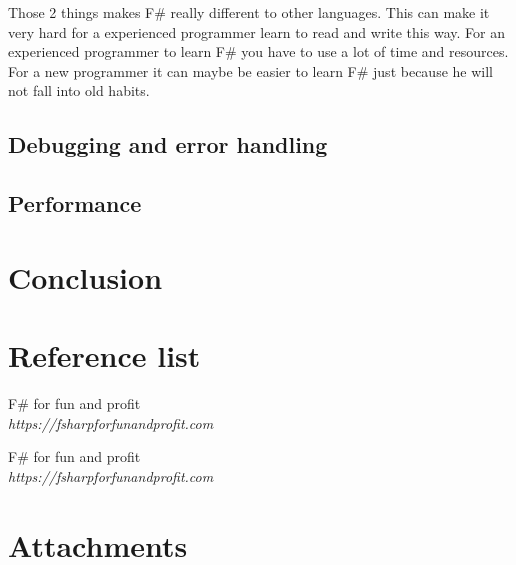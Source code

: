 \documentclass[12pt, a4paper]{article}
\begin{document}
Those 2 things makes F\# really different to other languages. This can make it very hard for a experienced programmer learn to read and write this way. For an experienced programmer to learn F\# you have to use a lot of time and resources. For a new programmer it can maybe be easier to learn F\# just because he will not fall into old habits.


\newpage
\subsection{Debugging and error handling}
\subsection{Performance}
\newpage

\section{Conclusion}
\newpage

\section{Reference list}

\begin{thebibliography}{9}

F\# for fun and profit\\
\emph{https://fsharpforfunandprofit.com}

F\# for fun and profit\\
\emph{https://fsharpforfunandprofit.com}

 
\end{thebibliography}
\newpage

\section{Attachments}
\end{document}
